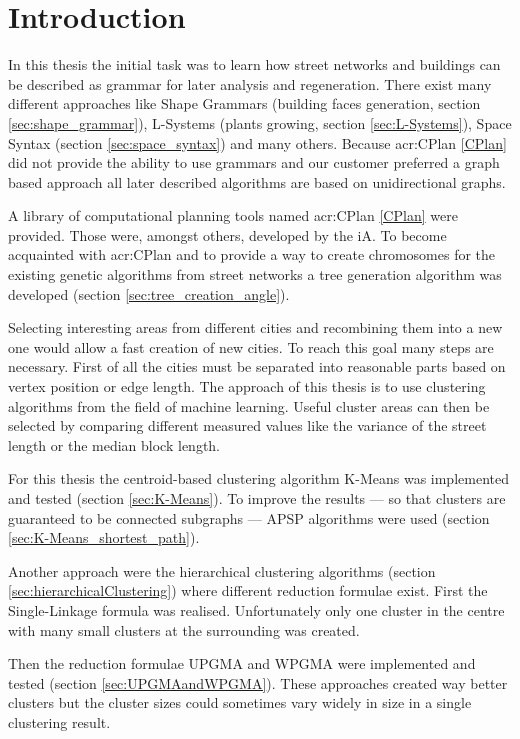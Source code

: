 \chapter{Introduction}
In this thesis the initial task was to learn how street networks and buildings can be described as grammar for later analysis and regeneration. There exist many different approaches like Shape Grammars (building faces generation, section \ref{sec:shape_grammar}), L-Systems (plants growing, section \ref{sec:L-Systems}), Space Syntax (section \ref{sec:space_syntax}) and many others. Because \acrshort{acr:CPlan} \ref{CPlan} did not provide the ability to use grammars and our customer preferred a graph based approach all later described algorithms are based on unidirectional graphs.

A library of computational planning tools named \acrshort{acr:CPlan} \ref{CPlan} were provided. Those were, amongst others, developed by the \gls{iA}. To become acquainted with \acrshort{acr:CPlan} and to provide a way to create chromosomes for the existing genetic algorithms from street networks a tree generation algorithm was developed (section \ref{sec:tree_creation_angle}).

Selecting interesting areas from different cities and recombining them into a new one would allow a fast creation of new cities. To reach this goal many steps are necessary. First of all the cities must be separated into reasonable parts based on vertex position or edge length. The approach of this thesis is to use clustering algorithms from the field of machine learning. Useful cluster areas can then be selected by comparing different measured values like the variance of the street length or the median block length.

For this thesis the centroid-based clustering algorithm K-Means was implemented and tested (section \ref{sec:K-Means}). To improve the results --- so that clusters are guaranteed to be connected subgraphs --- \gls{APSP} algorithms were used (section \ref{sec:K-Means_shortest_path}).

Another approach were the hierarchical clustering algorithms (section \ref{sec:hierarchicalClustering}) where different reduction formulae exist. First the Single-Linkage formula was realised. Unfortunately only one cluster in the centre with many small clusters at the surrounding was created.

\newpage

Then the reduction formulae \gls{UPGMA} and \gls{WPGMA} were implemented and tested (section \ref{sec:UPGMAandWPGMA}). These approaches created way better clusters but the cluster sizes could sometimes vary widely in size in a single clustering result.

